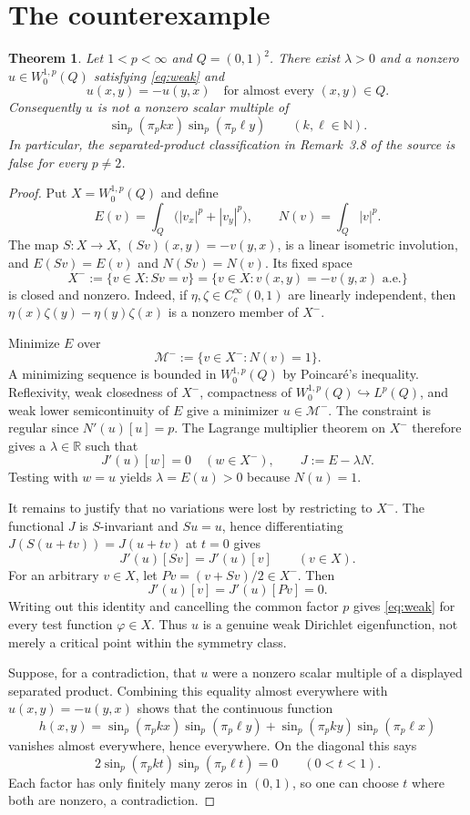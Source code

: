 \documentclass[11pt,a4paper]{article}
\newtheorem{theorem}{Theorem}
\newcommand{\R}{\mathbb R}
\begin{document}
\section{The counterexample}

\begin{theorem}\label{thm:square}
Let $1<p<\infty$ and $Q=(0,1)^2$.  There exist $\lambda>0$ and a nonzero
$u\in W^{1,p}_0(Q)$ satisfying \eqref{eq:weak} and
\[
 u(x,y)=-u(y,x)\quad\text{for almost every }(x,y)\in Q.
\]
Consequently $u$ is not a nonzero scalar multiple of
\[
 \sin_p(\pi_p kx)\sin_p(\pi_p\ell y)
 \qquad(k,\ell\in\mathbb N).
\]
In particular, the separated-product classification in Remark~3.8 of the
source is false for every $p\ne2$.
\end{theorem}

\begin{proof}
Put $X=W^{1,p}_0(Q)$ and define
\[
 E(v)=\int_Q\bigl(|v_x|^p+|v_y|^p\bigr),
 \qquad N(v)=\int_Q|v|^p.
\]
The map $S:X\to X$, $(Sv)(x,y)=-v(y,x)$, is a linear isometric involution,
and $E(Sv)=E(v)$ and $N(Sv)=N(v)$.  Its fixed space
\[
 X^-:=\{v\in X:Sv=v\}
      =\{v\in X:v(x,y)=-v(y,x)\text{ a.e.}\}
\]
is closed and nonzero.  Indeed, if $\eta,\zeta\in C_c^\infty(0,1)$ are
linearly independent, then
$\eta(x)\zeta(y)-\eta(y)\zeta(x)$ is a nonzero member of $X^-$.

Minimize $E$ over
\[
 \mathcal M^-:=\{v\in X^-:N(v)=1\}.
\]
A minimizing sequence is bounded in $W^{1,p}_0(Q)$ by Poincar\'e's
inequality.  Reflexivity, weak closedness of $X^-$, compactness of
$W^{1,p}_0(Q)\hookrightarrow L^p(Q)$, and weak lower semicontinuity of $E$
give a minimizer $u\in\mathcal M^-$.  The constraint is regular since
$N'(u)[u]=p$.  The Lagrange multiplier theorem on $X^-$ therefore gives a
$\lambda\in\R$ such that
\[
 J'(u)[w]=0\quad(w\in X^-),
 \qquad J:=E-\lambda N.
\]
Testing with $w=u$ yields $\lambda=E(u)>0$ because $N(u)=1$.

It remains to justify that no variations were lost by restricting to
$X^-$.  The functional $J$ is $S$-invariant and $Su=u$, hence differentiating
$J(S(u+tv))=J(u+tv)$ at $t=0$ gives
\[
 J'(u)[Sv]=J'(u)[v]\qquad(v\in X).
\]
For an arbitrary $v\in X$, let $Pv=(v+Sv)/2\in X^-$.  Then
\[
 J'(u)[v]=J'(u)[Pv]=0.
\]
Writing out this identity and cancelling the common factor $p$ gives
\eqref{eq:weak} for every test function $\varphi\in X$.  Thus $u$ is a
genuine weak Dirichlet eigenfunction, not merely a critical point within the
symmetry class.

Suppose, for a contradiction, that $u$ were a nonzero scalar multiple of a
displayed separated product.  Combining this equality almost everywhere
with $u(x,y)=-u(y,x)$ shows that the continuous function
\[
 h(x,y)=\sin_p(\pi_p kx)\sin_p(\pi_p\ell y)
       +\sin_p(\pi_p ky)\sin_p(\pi_p\ell x)
\]
vanishes almost everywhere, hence everywhere.  On the diagonal this says
\[
 2\sin_p(\pi_p kt)\sin_p(\pi_p\ell t)=0
 \qquad(0<t<1).
\]
Each factor has only finitely many zeros in $(0,1)$, so one can choose $t$
where both are nonzero, a contradiction.
\end{proof}
\end{document}
